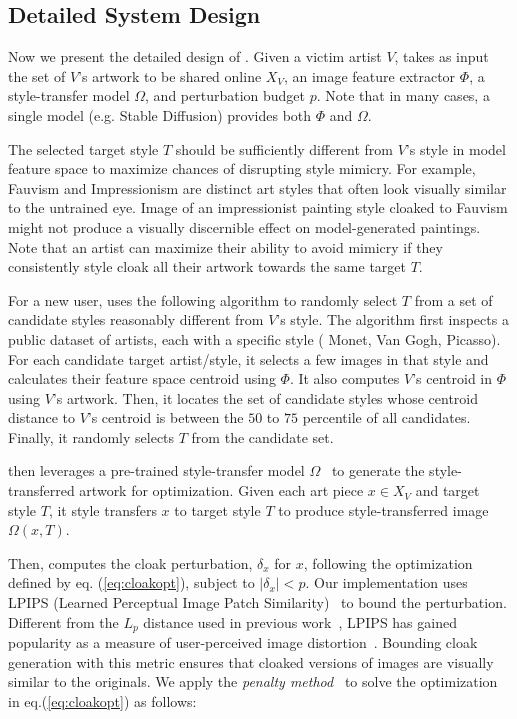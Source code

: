 \secspace
\subsection{Detailed System Design}
\label{sec:design-details}

Now we present the detailed design of \system{}. Given a victim
artist $V$, \system{} takes as input the set of $V$'s artwork to be shared
online $X_V$, an image feature extractor $\Phi$, a style-transfer model
$\Omega$, and perturbation budget $p$. Note that in many cases, a single
model (e.g. Stable Diffusion) provides both $\Phi$ and $\Omega$.

  The selected target style $T$
should be sufficiently different from $V$'s style in model feature space to
maximize chances of disrupting style mimicry. For example, Fauvism and
Impressionism are distinct art styles that often look visually similar to the
untrained eye. Image of an impressionist painting style cloaked to Fauvism
might not produce a visually discernible effect on model-generated
paintings. Note that an artist can maximize their ability to avoid mimicry if
they consistently style cloak all their artwork towards the same target $T$.

For a new user, \system{} uses the following algorithm to randomly select $T$ from a set
of candidate styles reasonably different from $V$'s style. The algorithm
first inspects a public dataset of artists, each with a specific style (\eg
Monet, Van Gogh, Picasso). For each candidate target artist/style, it selects
a few images in that style and calculates their feature space centroid using
$\Phi$. It also computes $V$'s centroid in $\Phi$ using $V$'s artwork. Then,
it locates the set of candidate styles whose centroid distance to $V$'s
centroid is between the $50$ to $75$ percentile of all candidates. Finally,
it randomly selects $T$ from the candidate set.

 \system{} then leverages a pre-trained
style-transfer model $\Omega$~\cite{rombach2022high} to generate the
style-transferred artwork for optimization. Given each art piece $x \in
X_V$ and target style $T$, it style transfers $x$ to target style $T$ to
produce style-transferred image $\Omega(x, T)$.  

 Then, \system{} computes the
cloak perturbation, $\delta_x$ for $x$, following the optimization defined
by eq. (\ref{eq:cloakopt}), subject to $|\delta_x| < p$. Our implementation
uses LPIPS (Learned Perceptual Image Patch
Similarity)~\cite{zhang2018unreasonable} to bound the perturbation. Different
from the $L_p$ distance used in previous
work~\cite{carlini2017towards,kurakin2016adversarial,sabour2015adversarial},
LPIPS has gained popularity as a measure of user-perceived image
distortion~\cite{cherepanova2021lowkey,laidlaw2020perceptual,rony2021augmented}. Bounding
cloak generation with this metric ensures that cloaked versions of images are
visually similar to the originals. We apply the \textit{penalty
  method}~\cite{nocedal2006numerical} to solve the optimization in
eq.(\ref{eq:cloakopt}) as follows:  

